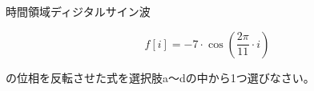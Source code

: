時間領域ディジタルサイン波 

\[
f[i] = -7 \cdot \cos \left ( \frac{2 \pi}{11}  \cdot i \right )
\]

\noindent の位相を反転させた式を選択肢a〜dの中から1つ選びなさい。
